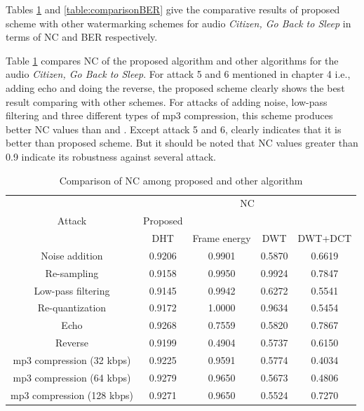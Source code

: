 \documentclass[12pt,a4paper]{report}
\begin{document}
\newpage

Tables \ref{table:comparisonNC} and \ref{table:comparisonBER} give the comparative results of proposed scheme with other watermarking schemes for audio \textit{Citizen, Go Back to Sleep} in terms of NC and BER respectively.

\bigskip

Table \ref{table:comparisonNC} compares NC of the proposed algorithm and other algorithms for the audio \textit{Citizen, Go Back to Sleep}. For attack 5 and 6 mentioned in chapter 4 i.e., adding echo and doing the reverse, the proposed scheme clearly shows the best result comparing with other schemes. For attacks of adding noise, low-pass filtering and three different types of mp3 compression, this scheme produces better NC values than \cite{dwt} and \cite{ieee}. Except attack 5 and 6, \cite{energy} clearly indicates that it is better than proposed scheme. But it should be noted that NC values greater than 0.9 indicate its robustness against several attack.

\begin{table}[h!]
 \centering
 \begin{tabular}{|c|c|c|c|c|} 
 \hline 
 \multirow{3}{*}{Attack} & \multicolumn{4}{|c|}{NC} \\
 \cline{2-5}
 & Proposed & \cite{energy} & \cite{dwt} & \cite{ieee} \\ 
 \cline{2-5}
 & DHT & Frame energy & DWT & DWT+DCT \\
 \hline
 Noise addition & 0.9206 & 0.9901 & 0.5870 & 0.6619 \\ 
  \hline
Re-sampling & 0.9158 & 0.9950 & 0.9924 & 0.7847 \\ 
 \hline
Low-pass filtering & 0.9145 & 0.9942 & 0.6272 & 0.5541 \\ 
 \hline
Re-quantization & 0.9172 & 1.0000 & 0.9634 & 0.5454 \\ 
 \hline
Echo & 0.9268 & 0.7559 & 0.5820 & 0.7867 \\ 
 \hline
Reverse & 0.9199 & 0.4904 & 0.5737 & 0.6150 \\ 
 \hline
mp3 compression (32 kbps) & 0.9225 & 0.9591 & 0.5774 & 0.4034 \\ 
 \hline
mp3 compression (64 kbps) & 0.9279 & 0.9650 & 0.5673 & 0.4806 \\ 
 \hline
mp3 compression (128 kbps) & 0.9271 & 0.9650 & 0.5524 & 0.7270 \\ 
 \hline
 \end{tabular}
 \newline
 \caption{Comparison of NC among proposed and other algorithm}
 \label{table:comparisonNC}
\end{table}
\end{document}
